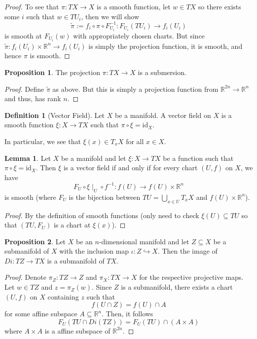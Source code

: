 \documentclass[]{article}
\theoremstyle{definition}
\theoremstyle{definition}
\newtheorem{definition}{Definition}[section]
\newtheorem{lemma}{Lemma}[section]
\newtheorem{proposition}{Proposition}[section]
\begin{document}
\begin{proof}
  To see that \(\pi : TX \to X\) is a smooth function, let \(w \in TX\) so 
  there exists some \(i\) such that \(w \in TU_i\), then we will show
  \[\tilde \pi := f_i \circ \pi \circ F_{U_i}^{-1} : F_{U_i}(TU_i) \to f_i(U_i)\]
  is smooth at \(F_{U_i}(w)\) with appropriately chosen charts. But since 
  \(\tilde \pi : f_i(U_i) \times \mathbb{R}^n \to f_i(U_i)\) is simply the 
  projection function, it is smooth, and hence \(\pi\) is smooth.
\end{proof}

\begin{proposition}
  The projection \(\pi : TX \to X\) is a submersion.
\end{proposition}
\begin{proof}
  Define \(\tilde \pi\) as above. But this is simply a projection function from 
  \(\mathbb{R}^{2n} \to \mathbb{R}^n\) and thus, has rank \(n\).
\end{proof}

\begin{definition}[Vector Field]
  Let \(X\) be a manifold. A vector field on \(X\) is a smooth function 
  \(\xi : X \to TX\) such that \(\pi \circ \xi = \text{id}_X\).

  In particular, we see that \(\xi(x) \in T_x X\) for all \(x \in X\).
\end{definition}

\begin{lemma}
  Let \(X\) be a manifold and let \(\xi : X \to TX\) be a function such that 
  \(\pi \circ \xi = \text{id}_X\). Then \(\xi\) is a vector field if and only 
  if for every chart \((U, f)\) on \(X\), we have 
  \[F_U \circ \xi\mid_U \circ f^{-1} : f(U) \to f(U) \times \mathbb{R}^n\]
  is smooth (where \(F_U\) is the bijection between 
  \(TU = \bigcup_{x \in U} T_x X\) and \(f(U) \times \mathbb{R}^n\)).
\end{lemma}
\begin{proof}
  By the definition of smooth functions (only need to check 
  \(\xi(U) \subseteq TU\) so that \((TU, F_U)\) is a chart at \(\xi(x)\)). 
\end{proof}

\begin{proposition}
  Let \(X\) be an \(n\)-dimensional manifold and let \(Z \subseteq X\) be a 
  submanifold of \(X\) with the inclusion map \(\iota : Z \hookrightarrow X\).
  Then the image of \(Di : TZ \to TX\) is a submanifold of \(TX\). 
\end{proposition}
\begin{proof}
  Denote \(\pi_Z : TZ \to Z\) and \(\pi_X : TX \to X\) for the respective projective 
  maps. Let \(w \in TZ\) and \(z = \pi_Z(w)\). Since \(Z\) is a submanifold, 
  there exists a chart \((U, f)\) on \(X\) containing \(z\) such that 
  \[f(U \cap Z) = f(U) \cap A\]
  for some affine subspace \(A \subseteq \mathbb{R}^n\). Then, it follows 
  \[F_U(TU \cap Di(TZ)) = F_U(TU) \cap (A \times A)\]
  where \(A \times A\) is a affine subspace of \(\mathbb{R}^{2n}\).
\end{proof}
\end{document}
